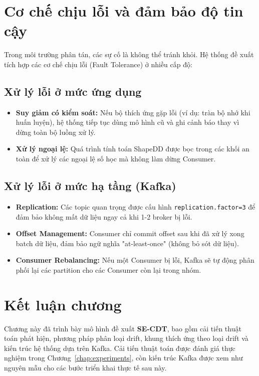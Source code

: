 \section{Cơ chế chịu lỗi và đảm bảo độ tin cậy}

Trong môi trường phân tán, các sự cố là không thể tránh khỏi. Hệ thống đề xuất tích hợp các cơ chế chịu lỗi (Fault Tolerance) ở nhiều cấp độ:

\subsection{Xử lý lỗi ở mức ứng dụng}
\begin{itemize}
	\item \textbf{Suy giảm có kiểm soát:} Nếu bộ thích ứng gặp lỗi (ví dụ: tràn bộ nhớ khi huấn luyện), hệ thống tiếp tục dùng mô hình cũ và ghi cảnh báo thay vì dừng toàn bộ luồng xử lý.
	\item \textbf{Xử lý ngoại lệ:} Quá trình tính toán ShapeDD được bọc trong các khối an toàn để xử lý các ngoại lệ số học mà không làm dừng Consumer.
\end{itemize}

\subsection{Xử lý lỗi ở mức hạ tầng (Kafka)}
\begin{itemize}
	\item \textbf{Replication:} Các topic quan trọng được cấu hình \texttt{replication.factor=3} để đảm bảo không mất dữ liệu ngay cả khi 1-2 broker bị lỗi.
	\item \textbf{Offset Management:} Consumer chỉ commit offset sau khi đã xử lý xong batch dữ liệu, đảm bảo ngữ nghĩa "at-least-once" (không bỏ sót dữ liệu).
	\item \textbf{Consumer Rebalancing:} Nếu một Consumer bị lỗi, Kafka sẽ tự động phân phối lại các partition cho các Consumer còn lại trong nhóm.
\end{itemize}

\section{Kết luận chương}
Chương này đã trình bày mô hình đề xuất \textbf{SE-CDT}, bao gồm cải tiến thuật toán phát hiện, phương pháp phân loại drift, khung thích ứng theo loại drift và kiến trúc hệ thống dựa trên Kafka. Cải tiến thuật toán được đánh giá thực nghiệm trong Chương~\ref{chap:experiments}, còn kiến trúc Kafka được xem như nguyên mẫu cho các bước triển khai thực tế sau này.
